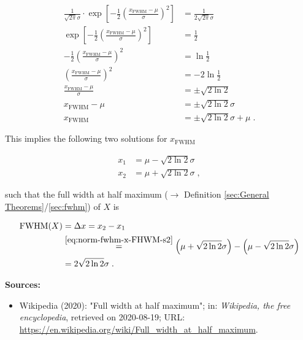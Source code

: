 \documentclass[a4paper,12pt,twoside]{book}
\begin{document}
\begin{equation} \label{eq:norm-fwhm-x-FHWM-s1}
\begin{split}
\frac{1}{\sqrt{2 \pi} \sigma} \cdot \exp \left[ -\frac{1}{2} \left( \frac{x_\mathrm{FWHM}-\mu}{\sigma} \right)^2 \right] &= \frac{1}{2 \sqrt{2 \pi} \sigma} \\
\exp \left[ -\frac{1}{2} \left( \frac{x_\mathrm{FWHM}-\mu}{\sigma} \right)^2 \right] &= \frac{1}{2} \\
-\frac{1}{2} \left( \frac{x_\mathrm{FWHM}-\mu}{\sigma} \right)^2 &= \ln \frac{1}{2} \\
\left( \frac{x_\mathrm{FWHM}-\mu}{\sigma} \right)^2 &= -2 \ln \frac{1}{2} \\
\frac{x_\mathrm{FWHM}-\mu}{\sigma} &= \pm \sqrt{2 \ln 2} \\
x_\mathrm{FWHM}-\mu &= \pm \sqrt{2 \ln 2} \sigma \\
x_\mathrm{FWHM} &= \pm \sqrt{2 \ln 2} \sigma + \mu \; .
\end{split}
\end{equation}

This implies the following two solutions for $x_\mathrm{FWHM}$

\begin{equation} \label{eq:norm-fwhm-x-FHWM-s2}
\begin{split}
x_1 &= \mu - \sqrt{2 \ln 2} \sigma \\
x_2 &= \mu + \sqrt{2 \ln 2} \sigma \; ,
\end{split}
\end{equation}

such that the full width at half maximum ($\rightarrow$ Definition \ref{sec:General Theorems}/\ref{sec:fwhm}) of $X$ is

\begin{equation} \label{eq:norm-fwhm-norm-fwhm-qed}
\begin{split}
\mathrm{FWHM}(X) &= \Delta x = x_2 - x_1 \\
&\overset{\eqref{eq:norm-fwhm-x-FHWM-s2}}{=} \left( \mu + \sqrt{2 \ln 2} \sigma \right) - \left( \mu - \sqrt{2 \ln 2} \sigma \right) \\
&= 2 \sqrt{2 \ln 2} \sigma \; .
\end{split}
\end{equation}


\vspace{1em}
\textbf{Sources:}
\begin{itemize}
\item Wikipedia (2020): "Full width at half maximum"; in: \textit{Wikipedia, the free encyclopedia}, retrieved on 2020-08-19; URL: \url{https://en.wikipedia.org/wiki/Full_width_at_half_maximum}.
\end{itemize}
\end{document}
